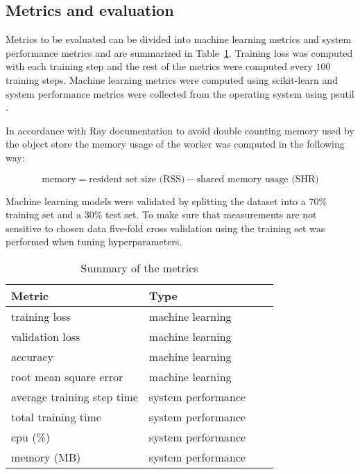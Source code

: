 \subsection{Metrics and evaluation}
Metrics to be evaluated can be divided into machine learning metrics and system performance metrics and are summarized in Table~\ref{table:metrics}. Training loss was computed with each training step and the rest of the metrics were computed every $100$ training steps. Machine learning metrics were computed using scikit-learn \parencite{pedregosaScikitlearnMachineLearning2011} and system performance metrics were collected from the operating system using psutil \parencite{rodolaGiampaoloPsutil2023}. 

In accordance with Ray documentation \parencite{therayteamMemoryManagementRay} to avoid double counting memory used by the object store the memory usage of the worker was computed in the following way:

\[ \text{memory} = \text{resident set size (RSS)} - \text{shared memory usage (SHR)} \]

Machine learning models were validated by splitting the dataset into a $70\%$ training set and a $30\%$ test set. To make sure that measurements are not sensitive to chosen data five-fold cross validation using the training set was performed when tuning hyperparameters.

\begin{table}[h]
    \centering
    \begin{tabular}{llll}
        \toprule
        Metric                     & Type               \\
        \midrule
        training loss              & machine learning   \\
        validation loss            & machine learning   \\
        accuracy                   & machine learning   \\
        root mean square error     & machine learning   \\
        average training step time & system performance \\
        total training time        & system performance \\
        cpu (\%)                   & system performance \\
        memory (MB)                & system performance \\
        
        \bottomrule
    \end{tabular}
    \caption{Summary of the metrics}
    \label{table:metrics}
\end{table}


